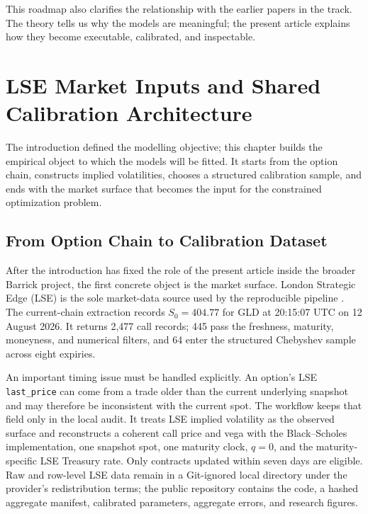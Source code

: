 \documentclass[a4paper,10pt,titlepage,oneside,openany]{book}
\theoremstyle{plain}
\theoremstyle{definition}
\theoremstyle{remark}
\begin{document}
This roadmap also clarifies the relationship with the earlier papers in the track. The theory tells us why the models are meaningful; the present article explains how they become executable, calibrated, and inspectable.


\chapter{LSE Market Inputs and Shared Calibration Architecture}

The introduction defined the modelling objective; this chapter builds the empirical object to which the models will be fitted. It starts from the option chain, constructs implied volatilities, chooses a structured calibration sample, and ends with the market surface that becomes the input for the constrained optimization problem.

\section{From Option Chain to Calibration Dataset}

After the introduction has fixed the role of the present article inside the broader Barrick project, the first concrete object is the market surface. London Strategic Edge (LSE) is the sole market-data source used by the reproducible pipeline \cite{LondonStrategicEdge2026}. The current-chain extraction records \(S_0=404.77\) for GLD at 20:15:07 UTC on 12 August 2026. It returns 2,477 call records; 445 pass the freshness, maturity, moneyness, and numerical filters, and 64 enter the structured Chebyshev sample across eight expiries.

An important timing issue must be handled explicitly. An option's LSE \texttt{last\_price} can come from a trade older than the current underlying snapshot and may therefore be inconsistent with the current spot. The workflow keeps that field only in the local audit. It treats LSE implied volatility as the observed surface and reconstructs a coherent call price and vega with the Black--Scholes implementation, one snapshot spot, one maturity clock, \(q=0\), and the maturity-specific LSE Treasury rate. Only contracts updated within seven days are eligible. Raw and row-level LSE data remain in a Git-ignored local directory under the provider's redistribution terms; the public repository contains the code, a hashed aggregate manifest, calibrated parameters, aggregate errors, and research figures.
\end{document}
